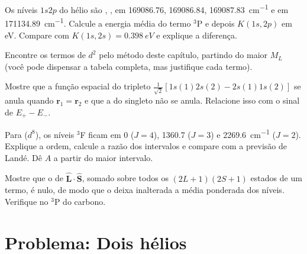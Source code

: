 \begin{exercise}[$\star\star$]\label{exo:b3:many-electron-atoms:8}
Os níveis $1s2p$ do hélio são , ,
 em 169086.76, 169086.84, \qty{169087.83}{cm^{-1}} e
 em \qty{171134.89}{cm^{-1}}. Calcule a energia média do
termo ${}^3$P e depois $K(1s,2p)$ em eV. Compare com $K(1s,2s) = \qty{0.398}{eV}$
e explique a diferença.
\end{exercise}

\begin{exercise}[$\star\star$]\label{exo:b3:many-electron-atoms:9}
Encontre os termos de $d^2$ pelo método deste capítulo, partindo do maior
$M_L$ (você pode dispensar a tabela completa, mas justifique cada termo).
\end{exercise}

\begin{exercise}[$\star\star\star$]\label{exo:b3:many-electron-atoms:10}
Mostre que a função espacial do tripleto $\frac{1}{\sqrt2}[1s(1)2s(2) -
2s(1)1s(2)]$ se anula quando $\mathbf r_1 = \mathbf r_2$ e que a do singleto
não se anula. Relacione isso com o sinal de $E_+ - E_-$.
\end{exercise}

\begin{exercise}[$\star\star\star$]\label{exo:b3:many-electron-atoms:11}
Para  ($d^8$), os níveis ${}^3$F ficam em 0 ($J = 4$), 1360.7 ($J = 3$)
e \qty{2269.6}{cm^{-1}} ($J = 2$). Explique a ordem, calcule a razão dos
intervalos e compare com a previsão de Landé. Dê $A$ a partir do maior
intervalo.
\end{exercise}

\begin{exercise}[$\star\star\star$]\label{exo:b3:many-electron-atoms:12}
Mostre que o  de $\hat{\mathbf L}\cdot\hat{\mathbf S}$, somado
sobre todos os $(2L+1)(2S+1)$ estados de um termo, é nulo, de modo que o
 deixa inalterada a média ponderada dos níveis.
Verifique no ${}^3$P do carbono.
\end{exercise}

\section{Problema: Dois hélios}

